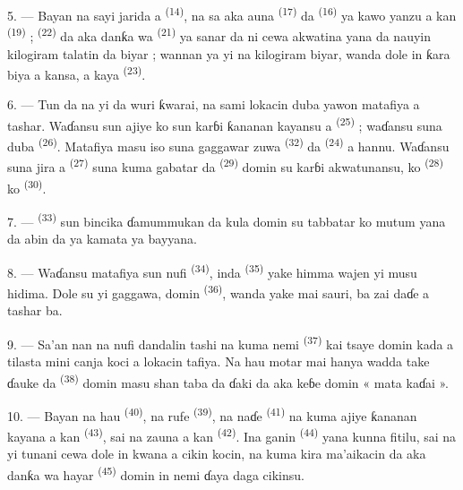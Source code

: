 \VUsaut{3.0mm}

5. --- Bayan na sayi jarida a 
\textsuperscript{(14)}, na sa aka auna  \textsuperscript{(17)} da
 \textsuperscript{(16)} ya kawo yanzu a kan
 \textsuperscript{(19)} ; 
\textsuperscript{(22)} da aka danƙa wa 
\textsuperscript{(21)} ya sanar da ni cewa akwatina yana da nauyin
kilogiram talatin da biyar ; wannan ya yi  na
kilogiram biyar, wanda dole in ƙara biya a kansa, a 
kaya \textsuperscript{(23)}.

6. --- Tun da na yi da wuri ƙwarai, na sami lokacin duba yawon
matafiya a tashar. Waɗansu sun ajiye ko sun karɓi ƙananan kayansu a
 \textsuperscript{(25)} ; waɗansu suna duba
 \textsuperscript{(26)}. Matafiya masu iso suna
gaggawar zuwa  \textsuperscript{(32)} da 
\textsuperscript{(24)} a hannu. Waɗansu suna jira a  \textsuperscript{(27)} suna kuma gabatar da 
\textsuperscript{(29)} domin su karɓi akwatunansu, ko 
\textsuperscript{(28)} ko  \textsuperscript{(30)}.

7. ---  \textsuperscript{(33)} sun bincika
ɗamummukan da kula domin su tabbatar ko mutum yana da abin da ya
kamata ya bayyana.

8. --- Waɗansu matafiya sun nufi 
\textsuperscript{(34)}, inda  \textsuperscript{(35)} yake
himma wajen yi musu hidima. Dole su yi gaggawa, domin  \textsuperscript{(36)}, wanda yake mai sauri, ba zai daɗe a tashar ba.

9. --- Sa’an nan na nufi dandalin tashi na kuma nemi 
\textsuperscript{(37)} kai tsaye domin kada a tilasta mini canja koci a
lokacin tafiya. Na hau motar mai hanya wadda take ɗauke da
 \textsuperscript{(38)} domin masu shan taba da ɗaki da aka
keɓe domin « mata kaɗai ».

\VUsaut{3.0mm}

10. --- Bayan na hau  \textsuperscript{(40)}, na rufe
 \textsuperscript{(39)}, na naɗe 
\textsuperscript{(41)} na kuma ajiye ƙananan kayana a kan 
\textsuperscript{(43)}, sai na zauna a kan 
\textsuperscript{(42)}. Ina ganin 
\textsuperscript{(44)} yana kunna fitilu, sai na yi tunani cewa dole in
kwana a cikin kocin, na kuma kira ma’aikacin da aka danƙa wa hayar
 \textsuperscript{(45)} domin in nemi ɗaya daga
cikinsu.

